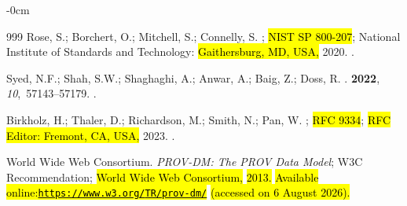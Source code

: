 \documentclass[blockchains,review,accept,moreauthors]{Definitions/mdpi}
\begin{document}
\begin{adjustwidth}{-\extralength}{0cm}
\begin{thebibliography}{999}
Rose, S.; Borchert, O.; Mitchell, S.; Connelly, S.
;
\newblock \hl{NIST SP 800-207}; National Institute of Standards and Technology: \hl{Gaithersburg, MD, USA,}
  2020.
.

Syed, N.F.; Shah, S.W.; Shaghaghi, A.; Anwar, A.; Baig, Z.; Doss, R.
.
 {\bf 2022}, {\em 10},~57143--57179.
.

Birkholz, H.; Thaler, D.; Richardson, M.; Smith, N.; Pan, W.
;
\newblock \hl{RFC 9334}; \hl{RFC Editor: Fremont, CA, USA,} %
  2023.
.

{World Wide Web Consortium}.
\newblock \emph{{PROV-DM}: The {PROV} Data Model};
\newblock W3C Recommendation;  \hl{World Wide Web Consortium,} \hl{2013.} %
\newblock \hl{Available online:}\space \href{https://www.w3.org/TR/prov-dm/}{\hl{\mbox{\nolinkurl{https://www.w3.org/}}}}\allowbreak\href{https://www.w3.org/TR/prov-dm/}{\hl{\mbox{\nolinkurl{TR/}}}}\allowbreak\href{https://www.w3.org/TR/prov-dm/}{\hl{\mbox{\nolinkurl{prov-dm/}}}} \space\hl{(accessed on 6 August 2026).}




\end{thebibliography}
\end{adjustwidth}
\end{document}
